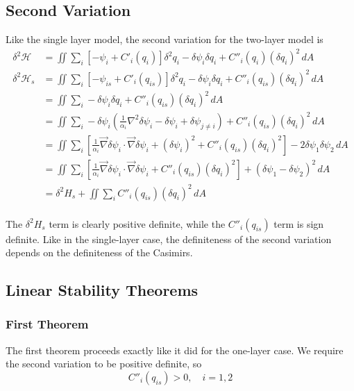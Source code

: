 \documentclass[12pt]{article}
\begin{document}
  \subsection{Second Variation}
    Like the single layer model, the second variation for the two-layer model is
    \begin{align*}
      \delta^2 \mathcal{H} &= \iint \sum_i \left[ - \psi_i + C'_i(q_i) \right]  \delta^2 q_i  - \delta \psi_i \delta q_i +  C''_i(q_i) (\delta q_i)^2  \, dA \\
      \delta^2 \mathcal{H}_s &= \iint \sum_i \left[ - \psi_{is} + C'_i(q_{is}) \right]  \delta^2 q_i  - \delta \psi_i \delta q_i +  C''_i(q_{is}) (\delta q_i)^2  \, dA \\
       &= \iint \sum_i - \delta \psi_i \delta q_i +  C''_i(q_{is}) (\delta q_i)^2  \, dA \\
       &= \iint \sum_i - \delta \psi_i \left( \frac{1}{\alpha_i} \nabla^2 \delta \psi_i - \delta\psi_i + \delta\psi_{j \ne i} \right) +  C''_i(q_{is}) (\delta q_i)^2  \, dA \\
       &= \iint \sum_i \left[ \frac{1}{\alpha_i} \vec\nabla\delta\psi_i \cdot \vec\nabla\delta\psi_i + (\delta\psi_i)^2 + C''_i(q_{is}) (\delta q_i)^2 \right]  - 2\delta\psi_1\delta\psi_2 \, dA \\
       &= \iint \sum_i \left[ \frac{1}{\alpha_i} \vec\nabla\delta\psi_i \cdot \vec\nabla\delta\psi_i + C''_i(q_{is}) (\delta q_i)^2 \right]+ (\delta\psi_1 - \delta\psi_2)^2 \, dA \\
       &= \delta^2 H_s + \iint \sum_i C''_i(q_{is})(\delta q_i)^2 \, dA \\
    \end{align*}

    The $\delta^2 H_s$ term is clearly positive definite, while the $C''_i(q_{is})$ term is sign definite. Like in the single-layer case, the definiteness of the second variation depends on the definiteness of the Casimirs.

  \subsection{Linear Stability Theorems}
    \subsubsection{First Theorem}
      The first theorem proceeds exactly like it did for the one-layer case. We require the second variation to be positive definite, so
      $$
      C''_i(q_{is}) > 0, \quad i=1,2
      $$
\end{document}
